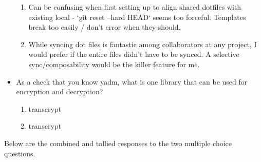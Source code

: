 \documentclass[letterpaper]{jdf}
\begin{document}
\begin{itemize}
	\begin{enumerate}
		\item Can be confusing when first setting up to align shared dotfiles with existing local - `git reset --hard HEAD` seems too forceful. Templates break too easily / don't error when they should.
		\item While syncing dot files is fantastic among collaborators at any project, I would prefer if the entire files didn't have to be synced. A selective sync/composability would be the killer feature for me.
	\end{enumerate}
	\item As a check that you know yadm, what is one library that can be used for encryption and decryption?
	\begin{enumerate}
		\item transcrypt
		\item transcrypt
	\end{enumerate}
\end{itemize}

Below are the combined and tallied responses to the two multiple choice questions.
\end{document}
